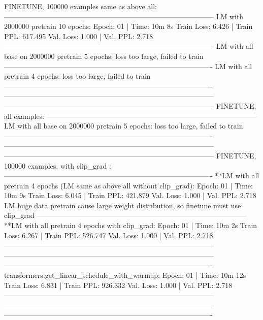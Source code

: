 \documentclass[letterpaper]{article} %
\begin{document}
\begin{CJK*}{UTF8}{gbsn}
FINETUNE, 100000 examples same as above all:
-----------------------------------------------------------------------------------------
LM with 2000000 pretrain 10 epochs:
Epoch: 01 | Time: 10m 8s
	Train Loss: 6.426 | Train PPL: 617.495
	 Val. Loss: 1.000 |  Val. PPL:   2.718
-----------------------------------------------------------------------------------------
LM with all base on 2000000 pretrain 5 epochs:
loss too large, failed to train
----------------------------------------------------------------------------------------
LM with all pretrain 4 epochs:
loss too large, failed to train
----------------------------------------------------------------------------------------
-----------------------------------------------------------------------------------------
-----------------------------------------------------------------------------------------
FINETUNE, all examples:
-----------------------------------------------------------------------------------------
LM with all base on 2000000 pretrain 5 epochs:
loss too large, failed to train
----------------------------------------------------------------------------------------
-----------------------------------------------------------------------------------------
-----------------------------------------------------------------------------------------
FINETUNE, 100000 examples, with clip_grad :
----------------------------------------------------------------------------------------
**LM with all pretrain 4 epochs (LM same as above all without clip_grad):
Epoch: 01 | Time: 10m 9s
	Train Loss: 6.045 | Train PPL: 421.879
	 Val. Loss: 1.000 |  Val. PPL:   2.718
LM huge data pretrain cause large weight distribution, so finetune must use clip_grad
-----------------------------------------------------------------------------------------
**LM with all pretrain 4 epochs with clip_grad:
Epoch: 01 | Time: 10m 2s
	Train Loss: 6.267 | Train PPL: 526.747
	 Val. Loss: 1.000 |  Val. PPL:   2.718
-----------------------------------------------------------------------------------------
-----------------------------------------------------------------------------------------
----------------------------------------------------------------------------------------
transformers.get_linear_schedule_with_warmup:
Epoch: 01 | Time: 10m 12s
	Train Loss: 6.831 | Train PPL: 926.332
	 Val. Loss: 1.000 |  Val. PPL:   2.718
-----------------------------------------------------------------------------------------
-----------------------------------------------------------------------------------------
----------------------------------------------------------------------------------------

\end{CJK*}
\end{document}
